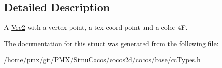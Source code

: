 \subsection{Detailed Description}
A \hyperlink{classVec2}{Vec2} with a vertex point, a tex coord point and a color 4F. 

The documentation for this struct was generated from the following file\+:\begin{DoxyCompactItemize}
\item 
/home/pmx/git/\+P\+M\+X/\+Simu\+Cocos/cocos2d/cocos/base/cc\+Types.\+h\end{DoxyCompactItemize}
